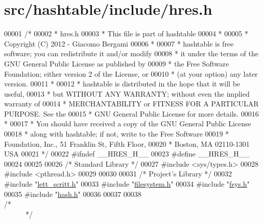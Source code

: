 \hypertarget{hres_8h_source}{
\section{src/hashtable/include/hres.h}
}

\begin{DoxyCode}
00001 \textcolor{comment}{/*}
00002 \textcolor{comment}{ * hres.h}
00003 \textcolor{comment}{ * This file is part of hashtable}
00004 \textcolor{comment}{ *}
00005 \textcolor{comment}{ * Copyright (C) 2012 - Giacomo Bergami}
00006 \textcolor{comment}{ *}
00007 \textcolor{comment}{ * hashtable is free software; you can redistribute it and/or modify}
00008 \textcolor{comment}{ * it under the terms of the GNU General Public License as published by}
00009 \textcolor{comment}{ * the Free Software Foundation; either version 2 of the License, or}
00010 \textcolor{comment}{ * (at your option) any later version.}
00011 \textcolor{comment}{ *}
00012 \textcolor{comment}{ * hashtable is distributed in the hope that it will be useful,}
00013 \textcolor{comment}{ * but WITHOUT ANY WARRANTY; without even the implied warranty of}
00014 \textcolor{comment}{ * MERCHANTABILITY or FITNESS FOR A PARTICULAR PURPOSE.  See the}
00015 \textcolor{comment}{ * GNU General Public License for more details.}
00016 \textcolor{comment}{ *}
00017 \textcolor{comment}{ * You should have received a copy of the GNU General Public License}
00018 \textcolor{comment}{ * along with hashtable; if not, write to the Free Software}
00019 \textcolor{comment}{ * Foundation, Inc., 51 Franklin St, Fifth Floor, }
00020 \textcolor{comment}{ * Boston, MA  02110-1301  USA}
00021 \textcolor{comment}{ */}
00022 \textcolor{preprocessor}{#ifndef \_\_HRES\_H\_\_}
00023 \textcolor{preprocessor}{}\textcolor{preprocessor}{#define \_\_HRES\_H\_\_}
00024 \textcolor{preprocessor}{}
00025 
00026 \textcolor{comment}{/*      Standard Library        */}
00027 \textcolor{preprocessor}{#include        <sys/types.h>}
00028 \textcolor{preprocessor}{#include        <pthread.h>}
00029 
00030 
00031 \textcolor{comment}{/*      Project's Library       */}
00032 \textcolor{preprocessor}{#include        "\hyperlink{lett__scritt_8h}{lett_scritt.h}"}
00033 \textcolor{preprocessor}{#include        "\hyperlink{filesystem_8h}{filesystem.h}"}
00034 \textcolor{preprocessor}{#include        "\hyperlink{fsys_8h}{fsys.h}"}
00035 \textcolor{preprocessor}{#include        "\hyperlink{hash_8h}{hash.h}"}
00036 
00037 
00038 \textcolor{comment}{/*~~~~~~~~~~~~~~~~~~~~~~~~~~~~~~~~~~~~~~~~~~~~~~~~~~~~~~~~~~~~~~~~~~~~~~~~~~~~*/}

\end{DoxyCode}
